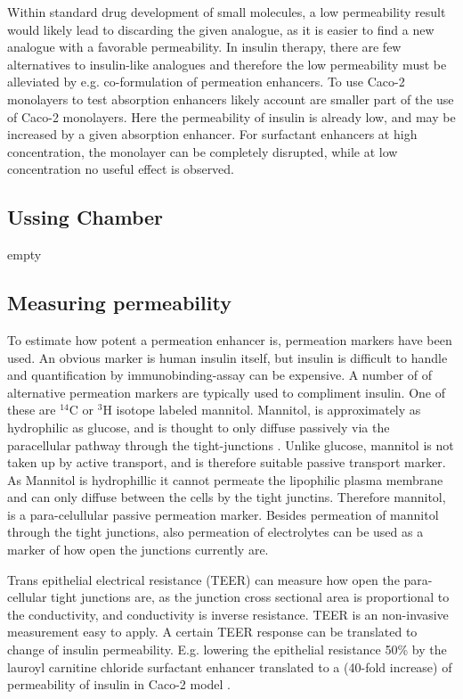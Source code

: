 Within standard drug development of small molecules, a low permeability result would likely lead to discarding the given analogue, as it is easier to find a new analogue with a favorable permeability. In insulin therapy, there are few alternatives to insulin-like analogues and therefore the low permeability must be alleviated by e.g. co-formulation of permeation enhancers. To use Caco-2 monolayers to test absorption enhancers likely account are smaller part of the use of Caco-2 monolayers. Here the permeability of insulin is already low, and may be increased by a given absorption enhancer. For surfactant enhancers at high concentration, the monolayer can be completely disrupted, while at low concentration no useful effect is observed.

\subsection{Ussing Chamber}
empty

\subsection{Measuring permeability}
To estimate how potent a permeation enhancer is, permeation markers have been used. An obvious marker is human insulin itself, but insulin is difficult to handle and quantification by immunobinding-assay can be expensive. A number of of alternative permeation markers are typically used to compliment insulin. One of these are $^{14}$C or $^3$H isotope labeled mannitol. Mannitol, is approximately as hydrophilic as glucose, and is thought to only diffuse passively via the paracellular pathway through the tight-junctions \cite{anderberg1992epithelial,artursson1994effect}. Unlike glucose, mannitol is not taken up by active transport, and is therefore suitable passive transport marker. As Mannitol is hydrophillic it cannot permeate the lipophilic plasma membrane and can only diffuse between the cells by the tight junctins. Therefore mannitol, is a para-celullular passive permeation marker. Besides permeation of mannitol through the tight junctions, also permeation of electrolytes can be used as a marker of how open the junctions currently are.

Trans epithelial electrical resistance (TEER) can measure how open the para-cellular tight junctions are, as the junction cross sectional area is proportional to the conductivity, and conductivity is inverse resistance. TEER is an non-invasive measurement easy to apply. A certain TEER response can be translated to change of insulin permeability. E.g. lowering the epithelial resistance 50\% by the lauroyl carnitine chloride surfactant enhancer translated to a (40-fold increase) of permeability of insulin in Caco-2 model \cite{welling2014citric}.

